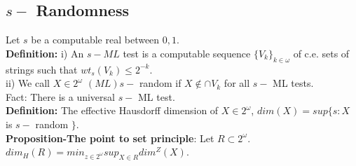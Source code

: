 \documentclass{article}
\begin{document}
   \subsection{$s-$ Randomness }
   Let $s$ be a computable real between $0,1$. \\
   \textbf{Definition:} i) An $s-ML$ test is a computable sequence $\{V_k\}_{k \in \omega}$ of c.e. sets of strings such that $wt_s(V_k) \leq 2^{-k}$. \\
   ii) We call $X \in 2^\omega$ $(ML) s-$ random if $X \not \in \cap V_k$ for all $s-$ ML tests.
   \\Fact: There is a universal $s-$ ML test. \\
   \textbf{Definition:} The effective Hausdorff dimension of $X \in 2^\omega$, $dim(X) = sup \{s : X $ is $s-$ random $\}$.\\
   \textbf{Proposition-The point to set principle}: Let $R \subset 2^\omega$. \\ $dim_H(R) = min_{z \in 2^\omega} sup_{X \in R} dim^Z(X)$.
   
  
    
\end{document}
